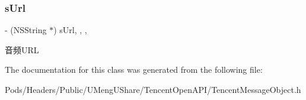 \subsubsection{\texorpdfstring{s\+Url}{sUrl}}
{\footnotesize\ttfamily -\/ (N\+S\+String $\ast$) s\+Url\hspace{0.3cm}{\ttfamily [read]}, {\ttfamily [write]}, {\ttfamily [nonatomic]}, {\ttfamily [retain]}}

音频\+U\+RL 

The documentation for this class was generated from the following file\+:\begin{DoxyCompactItemize}
\item 
Pods/\+Headers/\+Public/\+U\+Meng\+U\+Share/\+Tencent\+Open\+A\+P\+I/Tencent\+Message\+Object.\+h\end{DoxyCompactItemize}

